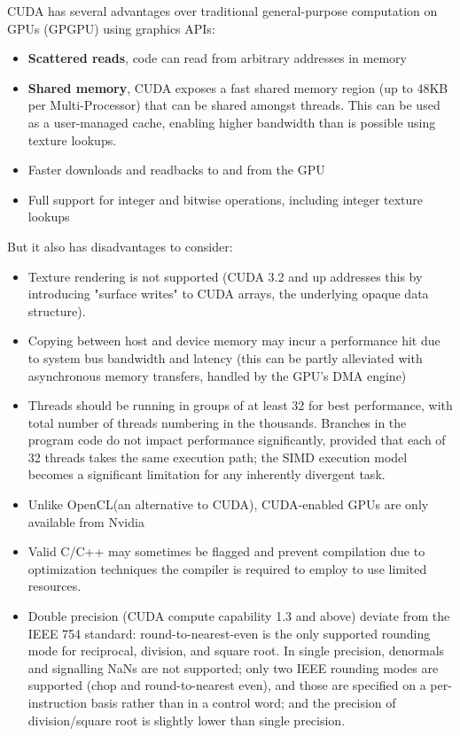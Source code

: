 \documentclass[12pt]{report}
\begin{document}
 CUDA has several advantages over traditional general-purpose computation on GPUs (GPGPU) using graphics APIs:
 \begin{itemize}
 \item \textbf{Scattered reads}, code can read from arbitrary addresses in memory
 \item \textbf{Shared memory}, CUDA exposes a fast shared memory region (up to 48KB per Multi-Processor) that can be shared amongst threads. This can be used as a user-managed cache, enabling higher bandwidth than is possible using texture lookups.
 \item Faster downloads and readbacks to and from the GPU
 \item Full support for integer and bitwise operations, including integer texture lookups
 \end{itemize}
 But it also has disadvantages to consider:
 \begin{itemize}
 \item Texture rendering is not supported (CUDA 3.2 and up addresses this by introducing "surface writes" to CUDA arrays, the underlying opaque data structure).
 \item Copying between host and device memory may incur a performance hit due to system bus bandwidth and latency (this can be partly alleviated with asynchronous memory transfers, handled by the GPU's DMA engine)
 \item Threads should be running in groups of at least 32 for best performance, with total number of threads numbering in the thousands. Branches in the program code do not impact performance significantly, provided that each of 32 threads takes the same execution path; the SIMD execution model becomes a significant limitation for any inherently divergent task.
 \item Unlike OpenCL(an alternative to CUDA), CUDA-enabled GPUs are only available from Nvidia
 \item Valid C/C++ may sometimes be flagged and prevent compilation due to optimization techniques the compiler is required to employ to use limited resources.
 \item Double precision (CUDA compute capability 1.3 and above) deviate from the IEEE 754 standard: round-to-nearest-even is the only supported rounding mode for reciprocal, division, and square root. In single precision, denormals and signalling NaNs are not supported; only two IEEE rounding modes are supported (chop and round-to-nearest even), and those are specified on a per-instruction basis rather than in a control word; and the precision of division/square root is slightly lower than single precision.
 \end{itemize}
 
\end{document}
